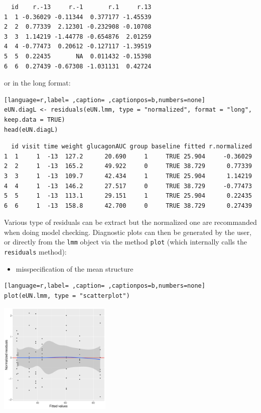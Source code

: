 \documentclass[12pt]{article}
\begin{document}
\begin{verbatim}
  id    r.-13     r.-1       r.1     r.13
1  1 -0.36029 -0.11344  0.377177 -1.45539
2  2  0.77339  2.12301 -0.232908 -0.10708
3  3  1.14219 -1.44778 -0.654876  2.01259
4  4 -0.77473  0.20612 -0.127117 -1.39519
5  5  0.22435       NA  0.011432 -0.15398
6  6  0.27439 -0.67308 -1.031131  0.42724
\end{verbatim}


or in the long format:
\begin{lstlisting}[language=r,label= ,caption= ,captionpos=b,numbers=none]
eUN.diagL <- residuals(eUN.lmm, type = "normalized", format = "long", keep.data = TRUE)
head(eUN.diagL)
\end{lstlisting}

\begin{verbatim}
  id visit time weight glucagonAUC group baseline fitted r.normalized
1  1     1  -13  127.2      20.690     1     TRUE 25.904     -0.36029
2  2     1  -13  165.2      49.922     0     TRUE 38.729      0.77339
3  3     1  -13  109.7      42.434     1     TRUE 25.904      1.14219
4  4     1  -13  146.2      27.517     0     TRUE 38.729     -0.77473
5  5     1  -13  113.1      29.151     1     TRUE 25.904      0.22435
6  6     1  -13  158.8      42.700     0     TRUE 38.729      0.27439
\end{verbatim}


Various type of residuals can be extract but the normalized one are
recommanded when doing model checking. Diagnostic plots can then be
generated by the user, or directly from the \texttt{lmm} object via the
method \texttt{plot} (which internally calls the \texttt{residuals} method):
\begin{itemize}
\item misspecification of the mean structure
\end{itemize}
\begin{lstlisting}[language=r,label= ,caption= ,captionpos=b,numbers=none]
plot(eUN.lmm, type = "scatterplot")
\end{lstlisting}

\begin{center}
\includegraphics[width=0.4\textwidth]{./figures/diag-scatterplot.pdf}
\end{center}
\end{document}
